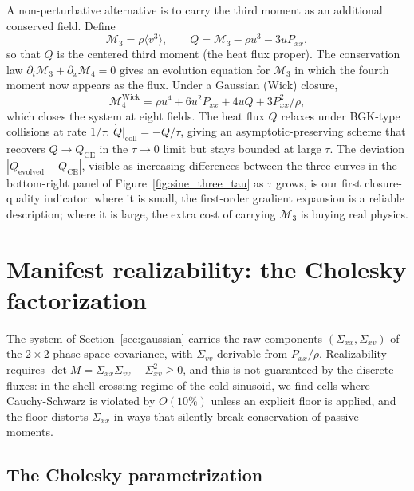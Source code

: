 \documentclass[11pt,letterpaper]{article}
\begin{document}
A non-perturbative alternative is to carry the third moment as an additional conserved field. Define
\begin{equation}
\mathcal{M}_3 = \rho \langle v^3 \rangle, \qquad Q = \mathcal{M}_3 - \rho u^3 - 3 u P_{xx},
\end{equation}
so that $Q$ is the centered third moment (the heat flux proper). The conservation law $\partial_t \mathcal{M}_3 + \partial_x \mathcal{M}_4 = 0$ gives an evolution equation for $\mathcal{M}_3$ in which the fourth moment now appears as the flux. Under a Gaussian (Wick) closure,
\begin{equation}
\mathcal{M}_4^{\mathrm{Wick}} = \rho u^4 + 6 u^2 P_{xx} + 4 u Q + 3 P_{xx}^2/\rho,
\label{eq:wick_m4}
\end{equation}
which closes the system at eight fields. The heat flux $Q$ relaxes under BGK-type collisions at rate $1/\tau$: $\dot Q|_{\mathrm{coll}} = -Q/\tau$, giving an asymptotic-preserving scheme that recovers $Q \to Q_{\mathrm{CE}}$ in the $\tau \to 0$ limit but stays bounded at large $\tau$. The deviation $|Q_{\mathrm{evolved}} - Q_{\mathrm{CE}}|$, visible as increasing differences between the three curves in the bottom-right panel of Figure~\ref{fig:sine_three_tau} as $\tau$ grows, is our first closure-quality indicator: where it is small, the first-order gradient expansion is a reliable description; where it is large, the extra cost of carrying $\mathcal{M}_3$ is buying real physics.

\section{Manifest realizability: the Cholesky factorization}
\label{sec:cholesky}

The system of Section~\ref{sec:gaussian} carries the raw components $(\Sigma_{xx}, \Sigma_{xv})$ of the $2\times 2$ phase-space covariance, with $\Sigma_{vv}$ derivable from $P_{xx}/\rho$. Realizability requires $\det M = \Sigma_{xx}\Sigma_{vv} - \Sigma_{xv}^2 \geq 0$, and this is not guaranteed by the discrete fluxes: in the shell-crossing regime of the cold sinusoid, we find cells where Cauchy-Schwarz is violated by $O(10\%)$ unless an explicit floor is applied, and the floor distorts $\Sigma_{xx}$ in ways that silently break conservation of passive moments.

\subsection{The Cholesky parametrization}
\end{document}
